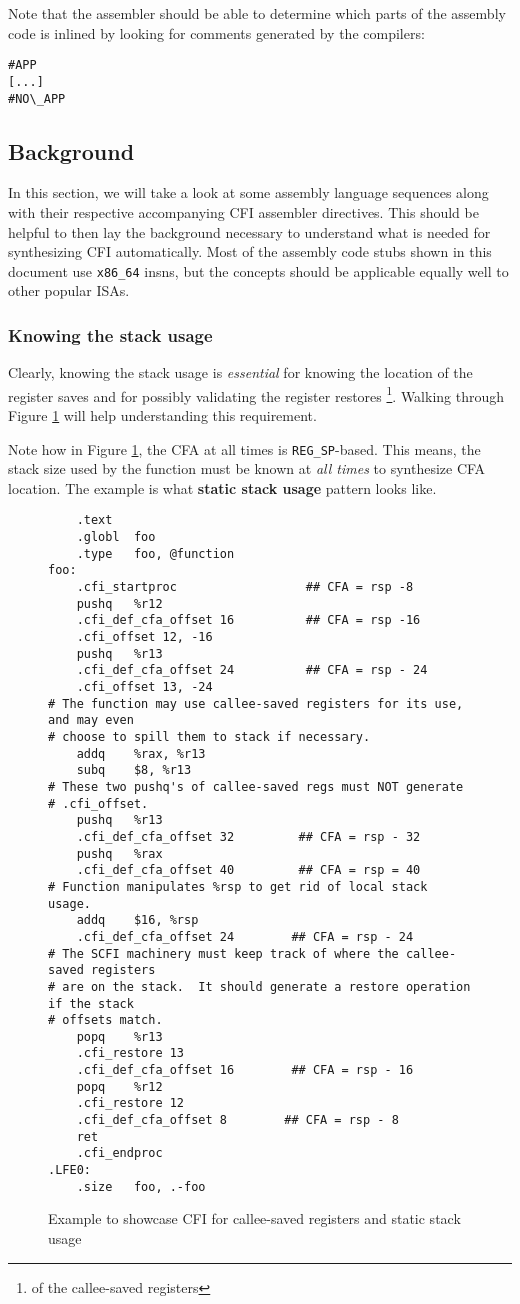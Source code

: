 \documentclass{article} \usepackage[a4paper, total={6in, 8in}]{geometry}
\begin{document}
Note that the assembler should be able to determine which parts of the assembly code
is inlined by looking for comments generated by the compilers:

\begin{verbatim}
#APP
[...]
#NO\_APP
\end{verbatim}

\subsection{Background}
\label{Background}
In this section, we will take a look at some assembly language sequences along
with their respective accompanying CFI assembler directives.  This should be
helpful to then lay the background necessary to understand what is needed for
synthesizing CFI automatically.  Most of the assembly code stubs shown in
this document use \texttt{x86\_64} insns, but the concepts should be applicable
equally well to other popular ISAs.

\subsubsection{Knowing the stack usage}
Clearly, knowing the stack usage is \emph{essential} for knowing the location
of the register saves and for possibly validating the register restores
\footnote{of the callee-saved registers}.  Walking through Figure
\ref{calleesavedexample} will help understanding this requirement.

Note how in Figure \ref{calleesavedexample}, the CFA at all times is
\texttt{REG\_SP}-based.  This means, the stack size used by the function must be
known at \emph{all times} to synthesize CFA location.  The example is what
\textbf{static stack usage} pattern looks like.

\begin{figure}
\caption{Example to showcase CFI for callee-saved registers and static stack
    usage}
\label{calleesavedexample}
\begin{verbatim}
	.text
	.globl	foo
	.type	foo, @function
foo:
	.cfi_startproc                  ## CFA = rsp -8
	pushq	%r12
	.cfi_def_cfa_offset 16          ## CFA = rsp -16
	.cfi_offset 12, -16
	pushq	%r13
	.cfi_def_cfa_offset 24          ## CFA = rsp - 24
	.cfi_offset 13, -24
# The function may use callee-saved registers for its use, and may even
# choose to spill them to stack if necessary.
	addq    %rax, %r13
	subq 	$8, %r13
# These two pushq's of callee-saved regs must NOT generate
# .cfi_offset.
	pushq	%r13
	.cfi_def_cfa_offset 32         ## CFA = rsp - 32
	pushq	%rax
	.cfi_def_cfa_offset 40         ## CFA = rsp = 40
# Function manipulates %rsp to get rid of local stack usage.
	addq	$16, %rsp
	.cfi_def_cfa_offset 24        ## CFA = rsp - 24
# The SCFI machinery must keep track of where the callee-saved registers
# are on the stack.  It should generate a restore operation if the stack
# offsets match.
	popq	%r13
	.cfi_restore 13
	.cfi_def_cfa_offset 16        ## CFA = rsp - 16
	popq	%r12
	.cfi_restore 12
	.cfi_def_cfa_offset 8        ## CFA = rsp - 8
	ret
	.cfi_endproc
.LFE0:
	.size	foo, .-foo
\end{verbatim}
\end{figure}
\end{document}
